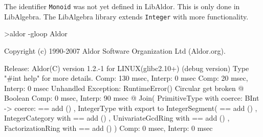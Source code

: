 
The identifier \texttt{Monoid} was not yet defined in LibAldor. This
is only done in LibAlgebra. The LibAlgebra library extends
\texttt{Integer} with more functionality.

\begin{smallverbatim}
>aldor -gloop
Aldor

Copyright (c) 1990-2007 Aldor Software Organization Ltd (Aldor.org).

Release: Aldor(C) version 1.2.-1 for LINUX(glibc2.10+) (debug version)
Type "#int help" for more details.
                                           Comp: 130 msec, Interp: 0 msec
                                           Comp: 20 msec, Interp: 0 msec
Unhandled Exception: RuntimeError()
Circular get broken
 @ Boolean
                                           Comp: 0 msec, Interp: 90 msec
 @ Join(
PrimitiveType with
        coerce: BInt -> %
        coerce: %
    ==  add ()
,
IntegerType with export to IntegerSegment(%
    ==  add ()
,
IntegerCategory with
    ==  add ()
,
UnivariateGcdRing with
    ==  add ()
,
FactorizationRing with
    ==  add ()
)
                                           Comp: 0 msec, Interp: 0 msec
\end{smallverbatim}
















